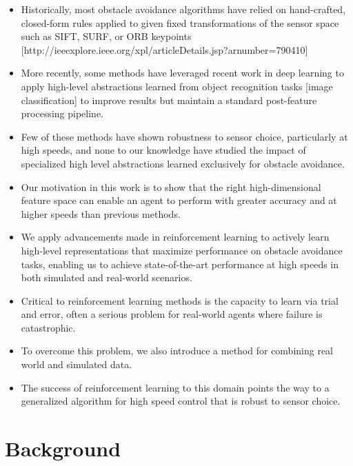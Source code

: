\documentclass[paper=a4, fontsize=11pt]{scrartcl} %
\begin{document}
\begin{itemize}
	\item Historically, most obstacle avoidance algorithms have relied on hand-crafted, closed-form rules applied to given fixed transformations of the sensor space such as SIFT, SURF, or ORB keypoints [http://ieeexplore.ieee.org/xpl/articleDetails.jsp?arnumber=790410]
	\item More recently, some methods have leveraged recent work in deep learning to apply high-level abstractions learned from object recognition tasks [image classification] to improve results but maintain a standard post-feature processing pipeline.
	\item Few of these methods have shown robustness to sensor choice, particularly at high speeds, and none to our knowledge have studied the impact of specialized high level abstractions learned exclusively for obstacle avoidance.
\end{itemize}

\begin{itemize}	
	\item Our motivation in this work is to show that the right high-dimensional feature space can enable an agent to perform with greater accuracy and at higher speeds than previous methods.
	\item We apply advancements made in reinforcement learning to actively learn high-level representations that maximize performance on obstacle avoidance tasks, enabling us to achieve state-of-the-art performance at high speeds in both simulated and real-world scenarios. 
\end{itemize}

\begin{itemize}
	\item Critical to reinforcement learning methods is the capacity to learn via trial and error, often a serious problem for real-world agents where failure is catastrophic.
	\item To overcome this problem, we also introduce a method for combining real world and simulated data.
	\item The success of reinforcement learning to this domain points the way to a generalized algorithm for high speed control that is robust to sensor choice.
\end{itemize}

\section{Background}
\end{document}
